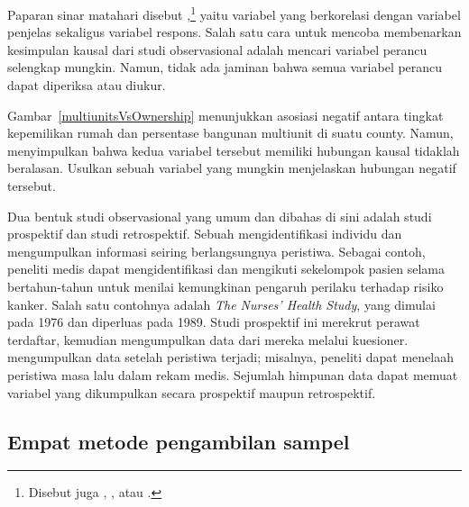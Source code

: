 Paparan sinar matahari disebut ,\footnote{Disebut juga
, , atau .}
yaitu variabel yang berkorelasi dengan variabel penjelas sekaligus variabel
respons. Salah satu cara untuk mencoba membenarkan kesimpulan kausal dari studi
observasional adalah mencari variabel perancu selengkap mungkin. Namun, tidak
ada jaminan bahwa semua variabel perancu dapat diperiksa atau diukur.


\begin{exercisewrap}
\begin{nexercise}
Gambar~\ref{multiunitsVsOwnership} menunjukkan asosiasi negatif
antara tingkat kepemilikan rumah dan persentase bangunan multiunit
di suatu county. Namun, menyimpulkan bahwa kedua variabel tersebut memiliki
hubungan kausal tidaklah beralasan.
Usulkan sebuah variabel yang mungkin menjelaskan hubungan
negatif tersebut.\footnotemark
\end{nexercise}
\end{exercisewrap}

Dua bentuk studi observasional yang umum dan dibahas di sini adalah
studi prospektif dan studi retrospektif.
Sebuah  mengidentifikasi individu
dan mengumpulkan informasi seiring berlangsungnya peristiwa.
Sebagai contoh, peneliti medis dapat mengidentifikasi dan mengikuti
sekelompok pasien selama bertahun-tahun untuk menilai kemungkinan pengaruh
perilaku terhadap risiko kanker.
Salah satu contohnya adalah \emph{The Nurses' Health Study},
yang dimulai pada 1976 dan diperluas pada 1989.
Studi prospektif ini merekrut perawat terdaftar, kemudian mengumpulkan data
dari mereka melalui kuesioner.
mengumpulkan data setelah peristiwa terjadi; misalnya, peneliti dapat
menelaah peristiwa masa lalu dalam rekam medis.
Sejumlah himpunan data dapat memuat variabel yang dikumpulkan secara
prospektif maupun retrospektif.


\subsection{Empat metode pengambilan sampel}
\label{fourSamplingMethods}
\label{threeSamplingMethods}

